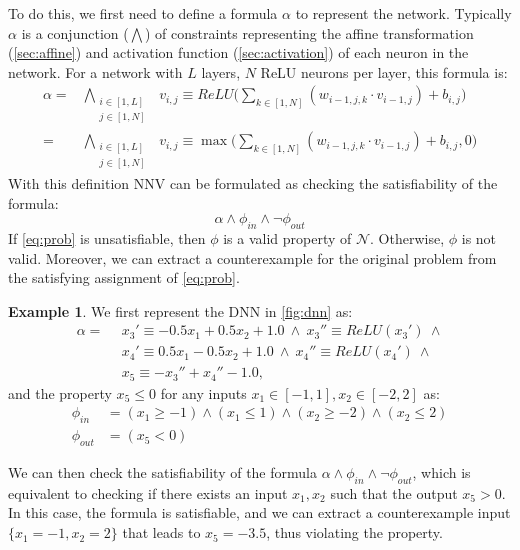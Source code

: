 \documentclass[oneside,11pt,dvipsnames]{book}
\numberwithin{equation}{section}
\theoremstyle{definition}
\newtheorem{example}{Example}[section]
\theoremstyle{remark}
\newcommand{\tvn}[1]{\iftoggle{usecomment}{{\color{red}{[TVN]: #1}}}{}}
\newcommand{\hai}[1]{\iftoggle{usecomment}{{\color{blue}{[HD]: #1}}}{}}
\begin{document}
To do this, we first need to define a formula $\alpha$ to represent the network. Typically $\alpha$ is a conjunction ($\bigwedge$) of constraints representing the affine transformation (\autoref{sec:affine}) and activation function (\autoref{sec:activation}) of each neuron in the network.
For a network\tvn{does this have to be FC?}\hai{No, but FC is simpler to define than CNN} with $L$ layers, $N$ ReLU neurons per layer, this formula is:
\begin{align*}
\alpha = &\bigwedge_{\begin{smallmatrix}i \in [1,L]\\ j \in [1,N]\end{smallmatrix}}~~v_{i,j} \equiv ReLU \Big( \sum_{k \in [1,N]} (w_{i-1,j,k} \cdot v_{i-1,j}) + b_{i,j}\Big)    \\
 = &\bigwedge_{\begin{smallmatrix}i \in [1,L]\\ j \in [1,N]\end{smallmatrix}}~~v_{i,j} \equiv \max \Big( \sum_{k \in [1,N]} (w_{i-1,j,k} \cdot v_{i-1,j}) + b_{i,j}, 0 \Big)
\end{align*}
With this definition NNV can be formulated as checking the satisfiability of the formula:
\begin{equation}\label{eq:prob}
  \alpha \land \phi_{in} \land \neg \phi_{out}
\end{equation}
If \autoref{eq:prob} is unsatisfiable, then $\phi$ is a valid property of $\mathcal{N}$. Otherwise, $\phi$ is not valid.  Moreover, we can extract a counterexample for the original problem from the satisfying assignment of \autoref{eq:prob}.

\begin{example}
We first represent the DNN in \autoref{fig:dnn} as:
\begin{align*}
\alpha = ~~& x_3' \equiv -0.5x_1 + 0.5x_2 + 1.0 ~\land~ x_3'' \equiv ReLU(x_3') ~\land \\
         ~~& x_4' \equiv 0.5x_1 - 0.5x_2 + 1.0  ~\land~ x_4'' \equiv ReLU(x_4') ~\land \\
         ~~& x_5 \equiv -x_3'' + x_4'' - 1.0,
\end{align*}
\noindent and the property $x_5 \le 0$ for any inputs $x_1 \in [-1,1], x_2\in[-2,2]$ as:
\begin{align*}
\phi_{in} &= (x_1 \ge -1) \land (x_1 \le 1) \land (x_2 \ge -2) \land (x_2 \le 2)\\
\phi_{out} &= (x_5 < 0)
\end{align*}

We can then check the satisfiability of the formula $\alpha \land \phi_{in} \land \neg \phi_{out}$, which is equivalent to checking if there exists an input $x_1, x_2$ such that the output $x_5 > 0$. In this case, the formula is satisfiable, and we can extract a counterexample input $\{x_1=-1, x_2=2\}$ that leads to $x_5 = -3.5$, thus violating the property.    

\end{example}
\end{document}
